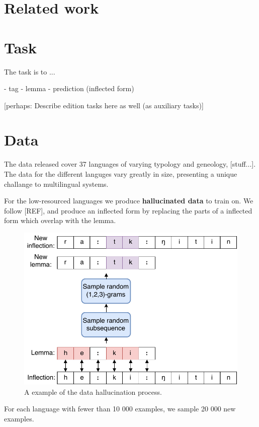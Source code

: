 \documentclass[11pt,a4paper]{article}
\begin{document}
\section{Related work}

\section{Task}

The task is to ... 

- tag
- lemma
- prediction (inflected form)

[perhaps: Describe edition tasks here as well (as auxiliary tasks)]

\section{Data}

The data released cover 37 languages of varying typology and
geneology, [stuff...]. The data for the different languges vary greatly
in size, presenting a unique challange to multilingual systems.

For the low-resourced languages we produce \textbf{hallucinated data}
to train on. We follow [REF], and produce an inflected form by
replacing the parts of a inflected form which overlap with the lemma.

\begin{figure}
\centering
\includegraphics[scale=0.5]{hall.pdf}
\caption{A example of the data hallucination process.}
\end{figure}


For each language with fewer than 10 000 examples, we sample 20 000
new examples.  %
\end{document}
